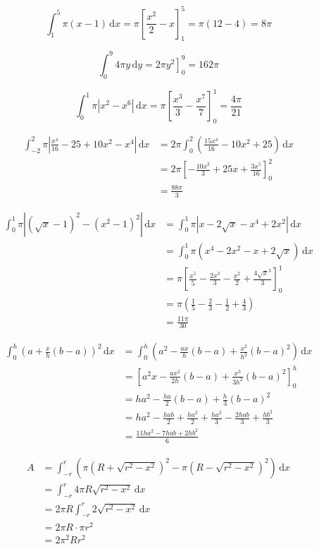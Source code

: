 \documentclass[a4paper,12pt]{article}
\newcommand{\ud}{\,\mathrm{d}}
\begin{document}
\[\int_1^5\pi(x - 1)\ud x
= \pi\left[\frac{x^2}{2} - x\right]_1^5
= \pi(12 - 4)
= 8\pi\tag{3}\]

\[\int_0^9 4\pi y \ud y = \left.2\pi y^2\right]_0^9 = 162\pi\tag{5}\]

\[\int_0^1\pi\left|x^2 - x^6\right|\ud x
= \pi\left[\frac{x^3}{3} - \frac{x^7}{7}\right]_0^1
= \frac{4\pi}{21}\tag{7}\]

\begin{align*}
   \int_{-2}^2\pi\left|\frac{x^4}{16} - 25 + 10x^2 - x^4\right|\ud x
&= 2\pi\int_0^2\left(\frac{15x^4}{16} - 10x^2 + 25\right)\ud x\\
&= 2\pi\left[-\frac{10x^3}{3} + 25x + \frac{3x^5}{16}\right]_0^2\\
&= \frac{88\pi}{3}\tag{8}
\end{align*}

\begin{align*}
   \int_0^1\pi\left|\left(\sqrt x - 1\right)^2 - \left(x^2 - 1\right)^2\right|\ud x
&= \int_0^1\pi\left|x - 2\sqrt x - x^4 + 2x^2\right|\ud x\\
&= \int_0^1\pi\left(x^4 - 2x^2 - x + 2\sqrt x\right)\ud x\\
&= \pi\left[\frac{x^5}{5} - \frac{2x^3}{3}
            - \frac{x^2}{2} + \frac{4\sqrt x^3}{3}\right]_0^1\\
&= \pi\left(\frac{1}{5} - \frac{2}{3} - \frac{1}{2} + \frac{4}{3}\right)\\
&= \frac{11\pi}{30}\tag{11}
\end{align*}

\begin{align*}
   \int_0^h\left(a + \frac{x}{h}(b-a)\right)^2\ud x
&= \int_0^h\left(a^2 - \frac{ax}{h}(b-a) + \frac{x^2}{h^2}(b-a)^2\right)\ud x\\
&= \left[a^2 x - \frac{ax^2}{2h}(b-a) + \frac{x^3}{3h^2}(b-a)^2\right]_0^h\\
&= ha^2 - \frac{ha}{2}(b-a) + \frac{h}{3}(b-a)^2\\
&= ha^2 - \frac{hab}{2} + \frac{ha^2}{2}
 + \frac{ha^2}{3} - \frac{2hab}{3} + \frac{hb^2}{3}\\
&= \frac{11ha^2 - 7hab + 2hb^2}{6}\tag{50}
\end{align*}

\begin{align*}
A&=\int_{-r}^r\left(\pi\left(R + \sqrt{r^2 - x^2}\right)^2 -
                    \pi\left(R - \sqrt{r^2 - x^2}\right)^2\right)\ud x\\
 &=\int_{-r}^r 4\pi R\sqrt{r^2 - x^2}\ud x\\
 &=2\pi R\int_{-r}^r 2\sqrt{r^2 - x^2}\ud x\\
 &=2\pi R \cdot \pi r^2\\
 &=2\pi^2 R r^2\tag{61}
\end{align*}
\end{document}
